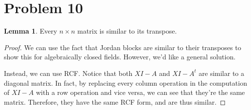 \documentclass{article}
\theoremstyle{definition}
\newtheorem{lemma}[theorem]{Lemma}
\begin{document}
\section{Problem 10}

\begin{lemma}
    Every $n \times n$ matrix is similar to its transpose.
\end{lemma}
\begin{proof}
    We can use the fact that Jordan blocks are similar to their transposes to show this for algebraically closed
    fields. However, we'd like a general solution.

    Instead, we can use RCF. Notice that both $XI - A$ and $XI - A^{t}$ are similar to a diagonal matrix.
    In fact, by replacing every column operation in the computation of $XI - A$ with a row operation
    and vice versa, we can see that they're the same matrix. Therefore, they have the same RCF form,
    and are thus similar.
\end{proof}
\end{document}
